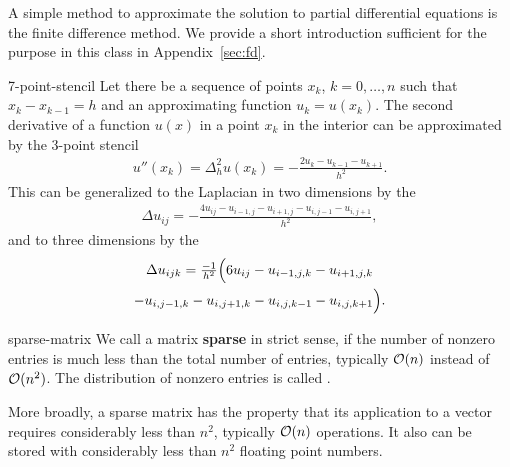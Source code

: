 \begin{intro}
  A simple method to approximate the solution to partial differential
  equations is the finite difference method. We provide a short
  introduction sufficient for the purpose in this class in
  Appendix~\ref{sec:fd}.
\end{intro}

\begin{Example}{7-point-stencil}
  Let there be a sequence of points $x_k$, $k=0,\dots,n$ such that
  $x_k-x_{k-1} = h$ and an approximating function $u_k = u(x_k)$. The
  second derivative of a function $u(x)$ in a point $x_k$ in the
  interior can be approximated by the 3-point stencil
  \begin{gather}
    u''(x_k) = \Delta_h^2 u(x_k) = - \frac{2 u_k - u_{k-1} - u_{k+1}}{h^2}.
  \end{gather}
  This can be generalized to the Laplacian in two dimensions by the 
  \begin{gather}
    \Delta u_{ij} = -\frac{4 u_{ij}- u_{i-1,j} - u_{i+1,j}- u_{i,j-1} - u_{i,j+1}}{h^2},
  \end{gather}
  and to three dimensions by the 
  \begin{multline}
    \Delta u_{ijk} = \tfrac{-1}{h^2}\Bigl(6 u_{ij}
    - u_{i-1,j,k} - u_{i+1,j,k}
    \\
    - u_{i,j-1,k} - u_{i,j+1,k}
    - u_{i,j,k-1} - u_{i,j,k+1}\Bigr).
  \end{multline}
\end{Example}

\begin{Definition}{sparse-matrix}
  We call a matrix \textbf{sparse} in strict
  sense, if the number of nonzero entries is much less than the total
  number of entries, typically $\mathcal O(n)$ instead of $\mathcal O(n^2)$. The
  distribution of nonzero entries is called .

  More broadly, a sparse matrix has the property that its application
  to a vector requires considerably less than $n^2$, typically
  $\mathcal O(n)$ operations. It also can be stored with considerably less
  than $n^2$ floating point numbers.
\end{Definition}

